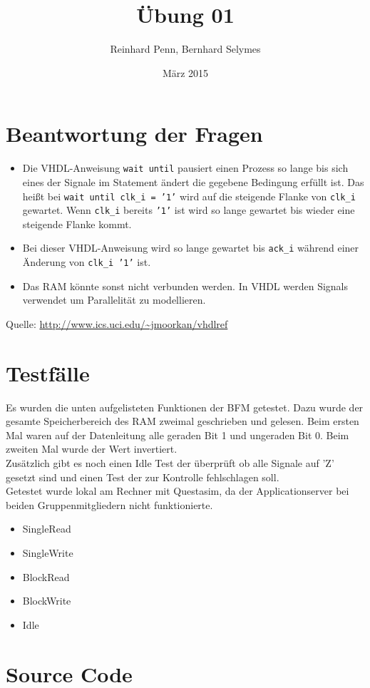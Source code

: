 \documentclass[12pt,a4paper]{article}
\begin{document}
\title{Übung 01}
\author{Reinhard Penn, Bernhard Selymes}
\date{März 2015}

\normalsize




\newcommand{\Uebung}{BFMVHDL}
\newcommand{\srcpath}{../../src}
\newcommand{\simpath}{../../sim}



\section{Beantwortung der Fragen}

\begin{itemize}
	\item Die VHDL-Anweisung \texttt{wait until} pausiert einen Prozess so lange bis sich eines der Signale im Statement ändert die gegebene Bedingung erfüllt ist. 
	Das heißt bei \texttt{wait until clk\_i = '1'} wird auf die steigende Flanke von \texttt{clk\_i} gewartet. Wenn \texttt{clk\_i} bereits \texttt{'1'} ist wird so lange gewartet bis wieder eine steigende Flanke kommt.
	\item Bei dieser VHDL-Anweisung wird so lange gewartet bis \texttt{ack\_i} während einer Änderung von \texttt{clk\_i '1'} ist.
	\item Das RAM könnte sonst nicht verbunden werden. In VHDL werden Signals verwendet um Parallelität zu modellieren.
\end{itemize}

Quelle: \url{http://www.ics.uci.edu/~jmoorkan/vhdlref}

\section{Testfälle}
Es wurden die unten aufgelisteten Funktionen der BFM getestet. Dazu wurde der gesamte Speicherbereich des RAM zweimal geschrieben und gelesen. Beim ersten Mal waren auf der Datenleitung alle geraden Bit 1 und ungeraden Bit 0. Beim zweiten Mal wurde der Wert invertiert. 
\\
Zusätzlich gibt es noch einen Idle Test der überprüft ob alle Signale auf 'Z' gesetzt sind und einen Test der zur Kontrolle fehlschlagen soll.
\\
Getestet wurde lokal am Rechner mit Questasim, da der Applicationserver bei beiden Gruppenmitgliedern nicht funktionierte.

\begin{itemize}
	\item SingleRead
	\item SingleWrite
	\item BlockRead
	\item BlockWrite
	\item Idle
\end{itemize}

\section{Source Code}






\end{document}
